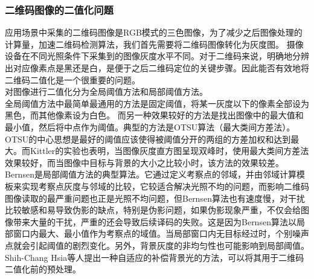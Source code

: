\subsubsection{二维码图像的二值化问题}
应用场景中采集的二维码图像是RGB模式的三色图像，为了减少之后图像处理的计算量，加速二维码检测算法，我们首先需要将二维码图像转化为灰度图。
摄像设备在不同光照条件下采集到的图像灰度水平不同。对于二维码来说，明确地分辨出对应像素点是黑还是白，是便于之后二维码定位的关键步骤。因此能否有效地将二维码二值化是一个很重要的问题。\\
对图像进行二值化分为全局阈值方法和局部阈值方法。\\
全局阈值方法中最简单最通用的方法是固定阈值，将某一灰度以下的像素全部设为黑色，而其他像素设为白色。
而另一种效果较好的方法是找出图像中的最大值和最小值，然后将中点作为阈值。典型的方法是OTSU算法（最大类间方差法）。OTSU的中心思想是最好的阈值应该使得被阈值分开的两组的方差加权和达到最大\cite{1}。而Kittler的实验\cite{2}也表明，当图像灰度直方图呈现双峰时，使用最大类间方差法效果较好，而当图像中目标与背景的大小之比较小时，该方法的效果较差。\\
Bernsen是局部阈值方法的典型算法。它通过定义考察点的邻域，并由邻域计算模板来实现考察点灰度与邻域的比较，它较适合解决光照不均的问题，而影响二维码图像读取的最严重问题也正是光照不均问题，但Bernsen算法也有速度慢，对干扰比较敏感和易导致伪影的缺点，特别是伪影问题，如果伪影现象严重，不仅会给图像带来大量的干扰，严重的还会导致后续译码的失败\cite{3}\cite{4}\cite{5}。这是因为Bernsen算法以局部窗口内最大、最小值作为考察点的域值。当局部窗口内无目标经过时，个别噪声点就会引起阈值的剧烈变化。另外，背景灰度的非均匀性也可能影响到局部阈值。\\
Shih-Chang Hsia等人提出一种自适应的补偿背景光的方法\cite{6}，可以将其用于二维码二值化前的预处理。

